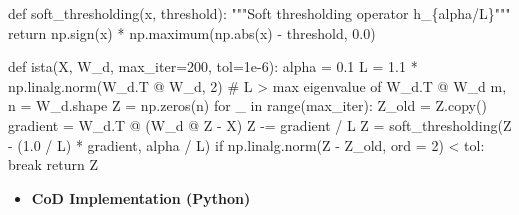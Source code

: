 \documentclass[
  letterpaper,
  DIV=11,
  numbers=noendperiod]{scrartcl}
\newenvironment{Shaded}{\begin{snugshade}}{\end{snugshade}}
\newcommand{\BuiltInTok}[1]{\textcolor[rgb]{0.40,0.85,0.94}{#1}}
\newcommand{\CommentTok}[1]{\textcolor[rgb]{0.46,0.44,0.37}{#1}}
\newcommand{\ControlFlowTok}[1]{\textcolor[rgb]{0.98,0.15,0.45}{#1}}
\newcommand{\DecValTok}[1]{\textcolor[rgb]{0.68,0.51,1.00}{#1}}
\newcommand{\FloatTok}[1]{\textcolor[rgb]{0.68,0.51,1.00}{#1}}
\newcommand{\KeywordTok}[1]{\textcolor[rgb]{0.98,0.15,0.45}{#1}}
\newcommand{\NormalTok}[1]{\textcolor[rgb]{0.97,0.97,0.95}{#1}}
\newcommand{\OperatorTok}[1]{\textcolor[rgb]{0.97,0.97,0.95}{#1}}
\providecommand{\tightlist}{%
  \setlength{\itemsep}{0pt}\setlength{\parskip}{0pt}}
\begin{document}
\begin{Shaded}
\begin{Highlighting}[]
\KeywordTok{def}\NormalTok{ soft\_thresholding(x, threshold):}
    \CommentTok{"""Soft thresholding operator h\_\{alpha/L\}"""}
    \ControlFlowTok{return}\NormalTok{ np.sign(x) }\OperatorTok{*}\NormalTok{ np.maximum(np.}\BuiltInTok{abs}\NormalTok{(x) }\OperatorTok{{-}}\NormalTok{ threshold, }\FloatTok{0.0}\NormalTok{)}

\KeywordTok{def}\NormalTok{ ista(X, W\_d, max\_iter}\OperatorTok{=}\DecValTok{200}\NormalTok{, tol}\OperatorTok{=}\FloatTok{1e{-}6}\NormalTok{):}
\NormalTok{    alpha }\OperatorTok{=} \FloatTok{0.1}
\NormalTok{    L }\OperatorTok{=} \FloatTok{1.1} \OperatorTok{*}\NormalTok{ np.linalg.norm(W\_d.T }\OperatorTok{@}\NormalTok{ W\_d, }\DecValTok{2}\NormalTok{)  }
    \CommentTok{\# L \textgreater{} max eigenvalue of W\_d.T @ W\_d}
\NormalTok{    m, n }\OperatorTok{=}\NormalTok{ W\_d.shape}
\NormalTok{    Z }\OperatorTok{=}\NormalTok{ np.zeros(n)}
    \ControlFlowTok{for}\NormalTok{ \_ }\KeywordTok{in} \BuiltInTok{range}\NormalTok{(max\_iter):}
\NormalTok{        Z\_old }\OperatorTok{=}\NormalTok{ Z.copy()}
\NormalTok{        gradient }\OperatorTok{=}\NormalTok{ W\_d.T }\OperatorTok{@}\NormalTok{ (W\_d }\OperatorTok{@}\NormalTok{ Z }\OperatorTok{{-}}\NormalTok{ X)}
\NormalTok{        Z }\OperatorTok{{-}=}\NormalTok{ gradient }\OperatorTok{/}\NormalTok{ L}
\NormalTok{        Z }\OperatorTok{=}\NormalTok{ soft\_thresholding(Z }\OperatorTok{{-}}\NormalTok{ (}\FloatTok{1.0} \OperatorTok{/}\NormalTok{ L) }\OperatorTok{*}\NormalTok{ gradient, alpha }\OperatorTok{/}\NormalTok{ L)}
        \ControlFlowTok{if}\NormalTok{ np.linalg.norm(Z }\OperatorTok{{-}}\NormalTok{ Z\_old, }\BuiltInTok{ord} \OperatorTok{=} \DecValTok{2}\NormalTok{) }\OperatorTok{\textless{}}\NormalTok{ tol:}
            \ControlFlowTok{break}
    \ControlFlowTok{return}\NormalTok{ Z}
\end{Highlighting}
\end{Shaded}

\begin{itemize}
\tightlist
\item
  \textbf{CoD Implementation (Python)}
\end{itemize}
\end{document}

